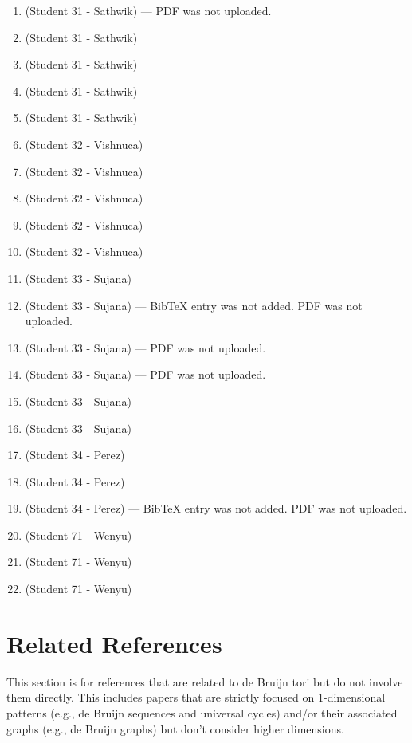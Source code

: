 \documentclass{article}
\begin{document}
\begin{enumerate}[label=\#\arabic*,noitemsep,nolistsep]
\item \cite{ivanyi1990three} (Student 31 - Sathwik) --- PDF was not uploaded.
\item \cite{jia2021oneshot} (Student 31 - Sathwik)
\item \cite{jeught2013robust} (Student 31 - Sathwik)
\item \cite{ma2021bayesian} (Student 31 - Sathwik)
\item \cite{chee2022robust} (Student 31 - Sathwik)
\item \cite{clapham1986universal} (Student 32 - Vishnuca)
\item \cite{kim2008aperiodic} (Student 32 - Vishnuca)
\item \cite{van1979pseudo} (Student 32 - Vishnuca)
\item \cite{chee2025constructions} (Student 32 - Vishnuca)
\item \cite{calabro1967synthesis} (Student 32 - Vishnuca)
\item \cite{savage1997survey} (Student 33 - Sujana)
\item \cite{stevens2014coolest} (Student 33 - Sujana) --- BibTeX entry was not added. PDF was not uploaded.
\item \cite{voorhees2008remarks} (Student 33 - Sujana) --- PDF was not uploaded.
\item \cite{martinez2011reproducing} (Student 33 - Sujana) --- PDF was not uploaded.
\item \cite{barber2010binary} (Student 33 - Sujana)
\item \cite{benk2025binary} (Student 33 - Sujana)
\item \cite{roig2021review} (Student 34 - Perez)
\item \cite{huang2023comprehensive} (Student 34 - Perez)
\item \cite{safaei2024graph} (Student 34 - Perez) --- BibTeX entry was not added. PDF was not uploaded.
\item \cite{becher2024nested} (Student 71 - Wenyu)
\item \cite{condon2024bruijn} (Student 71 - Wenyu)
\item \cite{etzion1999linear} (Student 71 - Wenyu)
\end{enumerate}


\section{Related References}
\label{sec:related}

This section is for references that are related to de Bruijn tori but do not involve them directly.
This includes papers that are strictly focused on 1-dimensional patterns (e.g., de Bruijn sequences and universal cycles) and/or their associated graphs (e.g., de Bruijn graphs) but don't consider higher dimensions.
\end{document}
